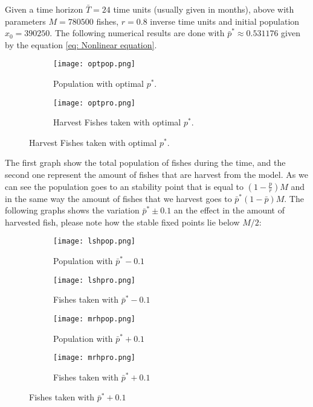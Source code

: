 Given a time horizon $\bar{T}=24$ time units (usually given in months), above with parameters $M=780500$ fishes, $r=0.8$ inverse time units and initial population $x_0=390250$. The following numerical results are done with $\bar{p}^*\approx 0.531176$ given by the equation \ref{eq: Nonlinear equation}. 

\begin{figure}[H]
	\centering
	\begin{subfigure}[b]{0.45\textwidth}
		\centering
		\texttt{[image: optpop.png]}
		\caption{Population with optimal $p^*$. }		
	\end{subfigure}
	\begin{subfigure}[b]{0.45\textwidth}
		\centering
		\texttt{[image: optpro.png]}
		\caption{Harvest Fishes taken with optimal $p^*$.}
	\end{subfigure}
\end{figure}

The first graph show the total population of fishes during the time, and the second one represent the amount of fishes that are harvest from the model. As we can see the population goes to an stability point that is equal to $\left(1-\frac{p}{r}\right)M$ and in the same way the amount of fishes that we harvest goes to $\bar{p}^*\left(1-\bar{p}\right)M$. The following graphs shows the variation $\bar{p}^*\pm0.1$  an the effect in the amount of harvested fish, please note how the stable fixed points lie below $M/2$:
\begin{figure}[H]
	\centering 
	\begin{subfigure}[b]{0.45\textwidth}
		\texttt{[image: lshpop.png]}
		\caption{Population with $\bar{p}^*-0.1$}		
	\end{subfigure}
	\begin{subfigure}[b]{0.45\textwidth}
		\texttt{[image: lshpro.png]}
		\caption{Fishes taken with $\bar{p}^*-0.1$}			
	\end{subfigure}
	\begin{subfigure}[b]{0.45\textwidth}
		\texttt{[image: mrhpop.png]}
		\caption{Population with $\bar{p}^*+0.1$}			
	\end{subfigure}
	\begin{subfigure}[b]{0.45\textwidth}
		\texttt{[image: mrhpro.png]}
		\caption{Fishes taken with $\bar{p}^*+0.1$}			
	\end{subfigure}
\end{figure} 

